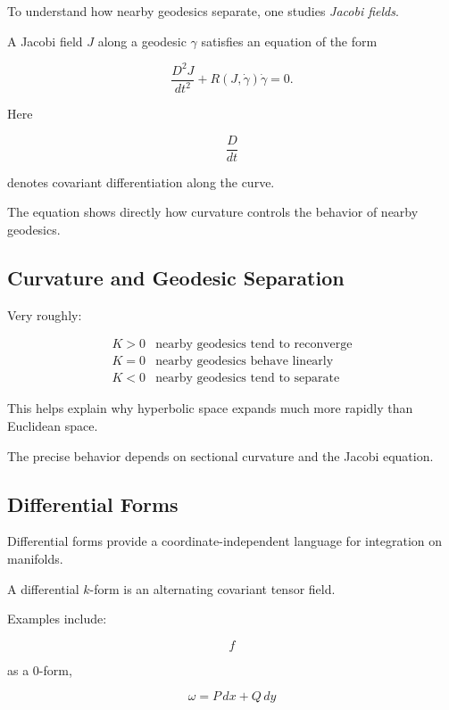 To understand how nearby geodesics separate, one studies \emph{Jacobi
fields}.

A Jacobi field \(J\) along a geodesic \(\gamma\) satisfies an equation of the
form

\[
\boxed{
\frac{D^2J}{dt^2}
+
R(J,\dot{\gamma})\dot{\gamma}
=
0.
}
\]

Here

\[
\frac{D}{dt}
\]

denotes covariant differentiation along the curve.

The equation shows directly how curvature controls the behavior of nearby
geodesics.

\subsection{Curvature and Geodesic Separation}
\label{subsec:curvature-geodesic-separation}

Very roughly:

\[
\boxed{
\begin{array}{c|c}
K>0 & \text{nearby geodesics tend to reconverge}\\
K=0 & \text{nearby geodesics behave linearly}\\
K<0 & \text{nearby geodesics tend to separate}
\end{array}
}
\]

This helps explain why hyperbolic space expands much more rapidly than
Euclidean space.

The precise behavior depends on sectional curvature and the Jacobi equation.

\subsection{Differential Forms}
\label{subsec:differential-forms-geometry}

Differential forms provide a coordinate-independent language for integration
on manifolds.

A differential \(k\)-form is an alternating covariant tensor field.

Examples include:

\[
f
\]

as a \(0\)-form,

\[
\omega=P\,dx+Q\,dy
\]

